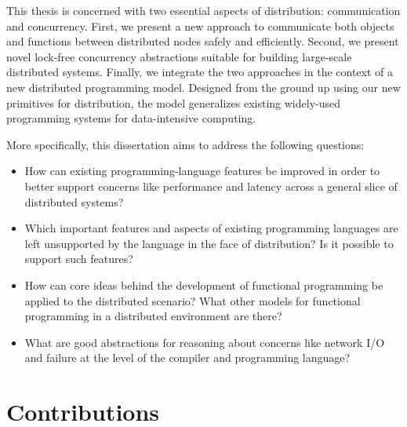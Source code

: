 
%

This thesis is concerned with two essential aspects of distribution:
communication and concurrency. First, we present a new approach to communicate
both objects and functions between distributed nodes safely and efficiently.
Second, we present novel lock-free concurrency abstractions suitable for
building large-scale distributed systems. Finally, we integrate the two
approaches in the context of a new distributed programming model. Designed from
the ground up using our new primitives for distribution, the model generalizes
existing widely-used programming systems for data-intensive computing.

More specifically, this dissertation aims to address the following questions:

\begin{itemize}

	\item How can existing programming-language features be improved in order to
	better support concerns like performance and latency across a general slice of
	distributed systems?

	\item Which important features and aspects of existing programming languages
	are left unsupported by the language in the face of distribution? Is it
	possible to support such features?

	\item How can core ideas behind the development of functional programming be
	applied to the distributed scenario? What other models for functional
	programming in a distributed environment are there?

	\item What are good abstractions for reasoning about concerns like network I/O
	and failure at the level of the compiler and programming language?

\end{itemize}

\section{Contributions}

